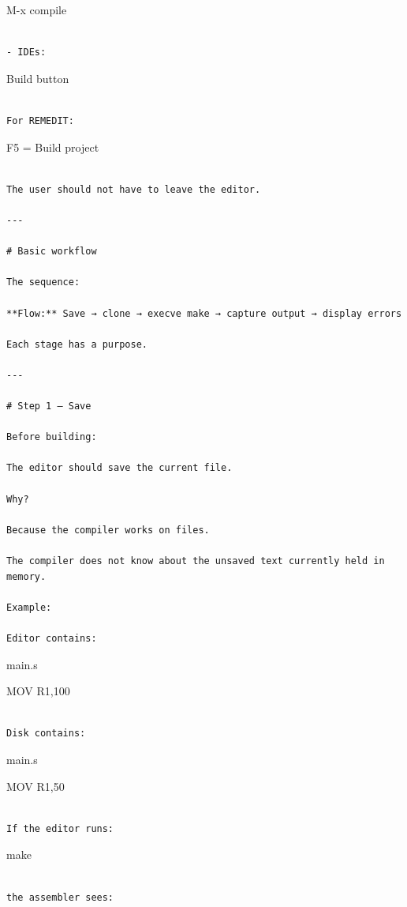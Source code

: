 \documentclass[
  oneside,
  openany]{book}
\begin{document}
M-x compile

\begin{verbatim}

- IDEs:
\end{verbatim}

Build button

\begin{verbatim}

For REMEDIT:
\end{verbatim}

F5 = Build project

\begin{verbatim}

The user should not have to leave the editor.

---

# Basic workflow

The sequence:

**Flow:** Save → clone → execve make → capture output → display errors

Each stage has a purpose.

---

# Step 1 — Save

Before building:

The editor should save the current file.

Why?

Because the compiler works on files.

The compiler does not know about the unsaved text currently held in memory.

Example:

Editor contains:
\end{verbatim}

main.s

MOV R1,100

\begin{verbatim}

Disk contains:
\end{verbatim}

main.s

MOV R1,50

\begin{verbatim}

If the editor runs:
\end{verbatim}

make

\begin{verbatim}

the assembler sees:
\end{verbatim}
\end{document}
